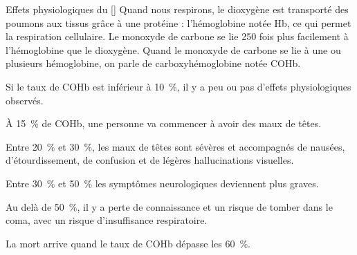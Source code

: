 \begin{doc}{Effets physiologiques du }[\label{doc:effets_physiologiques}]
  Quand nous respirons, le dioxygène est transporté des poumons aux tissus grâce à une protéine : l'hémoglobine notée Hb, ce qui permet la respiration cellulaire.
  Le monoxyde de carbone  se lie 250 fois plus facilement à l'hémoglobine que le dioxygène.
  Quand le monoxyde de carbone se lie à une ou plusieurs hémoglobine, on parle de carboxyhémoglobine notée COHb.

  \begin{listePoints}
    \item Si le taux de COHb est inférieur à \qty{10}{\percent}, il y a peu ou pas d'effets physiologiques observés.
    \item À \qty{15}{\percent} de COHb, une personne va commencer à avoir des maux de têtes.
    \item Entre \qty{20}{\percent} et \qty{30}{\percent}, les maux de têtes sont sévères et accompagnés de nausées, d'étourdissement, de confusion et de légères hallucinations visuelles.
    \item Entre \qty{30}{\percent} et \qty{50}{\percent} les symptômes neurologiques deviennent plus graves.
    \item Au delà de \qty{50}{\percent}, il y a perte de connaissance et un risque de tomber dans le coma, avec un risque d'insuffisance respiratoire.
  \end{listePoints}
  La mort arrive quand le taux de COHb dépasse les \qty{60}{\percent}.
\end{doc}


